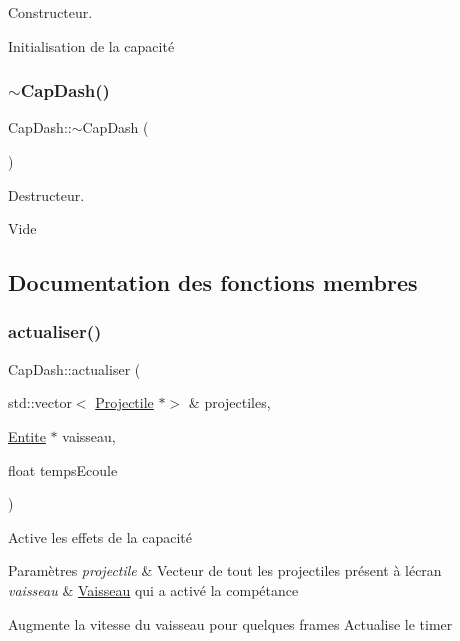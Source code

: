 Constructeur. 

Initialisation de la capacité \mbox{\label{class_cap_dash_aa935262b9ebdaf197294aba7211663cc}} 
\subsubsection{\texorpdfstring{$\sim$\+Cap\+Dash()}{~CapDash()}}
{\footnotesize\ttfamily Cap\+Dash\+::$\sim$\+Cap\+Dash (\begin{DoxyParamCaption}{ }\end{DoxyParamCaption})}



Destructeur. 

Vide 

\subsection{Documentation des fonctions membres}
\mbox{\label{class_cap_dash_ad4f99cef49151c1072a11af18852fa7b}} 
\subsubsection{\texorpdfstring{actualiser()}{actualiser()}}
{\footnotesize\ttfamily Cap\+Dash\+::actualiser (\begin{DoxyParamCaption}\item[{std\+::vector$<$ \hyperlink{class_projectile}{Projectile} $\ast$$>$ \&}]{projectiles,  }\item[{\hyperlink{class_entite}{Entite} $\ast$}]{vaisseau,  }\item[{float}]{temps\+Ecoule }\end{DoxyParamCaption})\hspace{0.3cm}{\ttfamily [virtual]}}



Active les effets de la capacité 


\begin{DoxyParams}{Paramètres}
{\em projectile} & Vecteur de tout les projectiles présent à l\textquotesingle{}écran \\
\hline
{\em vaisseau} & \hyperlink{class_vaisseau}{Vaisseau} qui a activé la compétance\\
\hline
\end{DoxyParams}
Augmente la vitesse du vaisseau pour quelques frames Actualise le timer 


